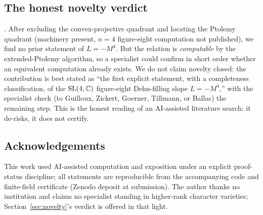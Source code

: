 \subsection{The honest novelty verdict} \sGated. After excluding the convex-projective quadrant and
locating the Ptolemy quadrant (machinery present, $n=4$ figure-eight computation not published), we find
no prior statement of $L=-M^4$. But the relation is \emph{computable} by the extended-Ptolemy algorithm,
so a specialist could confirm in short order whether an equivalent computation already exists. We do not
claim novelty closed: the contribution is best stated as ``the first explicit statement, with a
completeness classification, of the $\mathrm{SL}(4,\mathbb{C})$ figure-eight Dehn-filling slope $L=-M^4$,'' with the
specialist check (to Guilloux, Zickert, Goerner, Tillmann, or Ballas) the remaining step. This is the
honest reading of an AI-assisted literature search: it de-risks, it does not certify.

\subsection*{Acknowledgements} This work used AI-assisted computation and exposition under an explicit
proof-status discipline; all statements are reproducible from the accompanying code and finite-field
certificate (Zenodo deposit at submission). The author thanks no institution and claims no specialist
standing in higher-rank character varieties; Section~\ref{sec:novelty}'s verdict is offered in that light.
